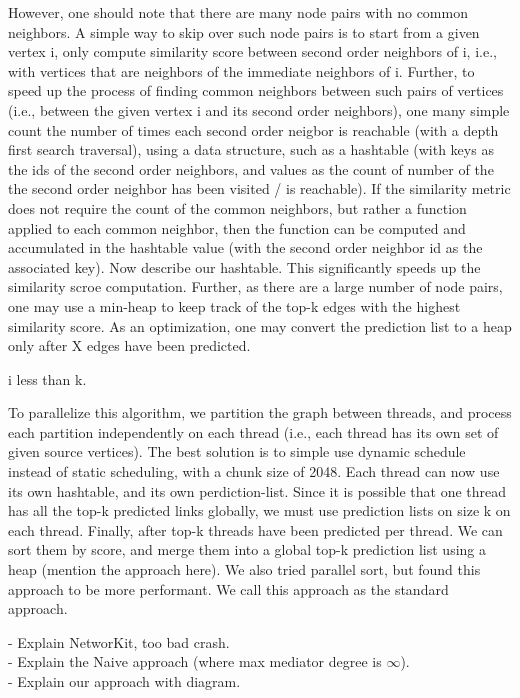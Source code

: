 However, one should note that there are many node pairs with no common neighbors. A simple way to skip over such node pairs is to start from a given vertex i, only compute similarity score between second order neighbors of i, i.e., with vertices that are neighbors of the immediate neighbors of i. Further, to speed up the process of finding common neighbors between such pairs of vertices (i.e., between the given vertex i and its second order neighbors), one many simple count the number of times each second order neigbor is reachable (with a depth first search traversal), using a data structure, such as a hashtable (with keys as the ids of the second order neighbors, and values as the count of number of the the second order neighbor has been visited / is reachable). If the similarity metric does not require the count of the common neighbors, but rather a function applied to each common neighbor, then the function can be computed and accumulated in the hashtable value (with the second order neighbor id as the associated key). Now describe our hashtable. This significantly speeds up the similarity scroe computation. Further, as there are a large number of node pairs, one may use a min-heap to keep track of the top-k edges with the highest similarity score. As an optimization, one may convert the prediction list to a heap only after X edges have been predicted.

i less than k.

To parallelize this algorithm, we partition the graph between threads, and process each partition independently on each thread (i.e., each thread has its own set of given source vertices). The best solution is to simple use dynamic schedule instead of static scheduling, with a chunk size of 2048. Each thread can now use its own hashtable, and its own perdiction-list. Since it is possible that one thread has all the top-k predicted links globally, we must use prediction lists on size k on each thread. Finally, after top-k threads have been predicted per thread. We can sort them by score, and merge them into a global top-k prediction list using a heap (mention the approach here). We also tried parallel sort, but found this approach to be more performant. We call this approach as the standard approach.





- Explain NetworKit, too bad crash. \\
- Explain the Naive approach (where max mediator degree is $\infty$). \\
- Explain our approach with diagram.

